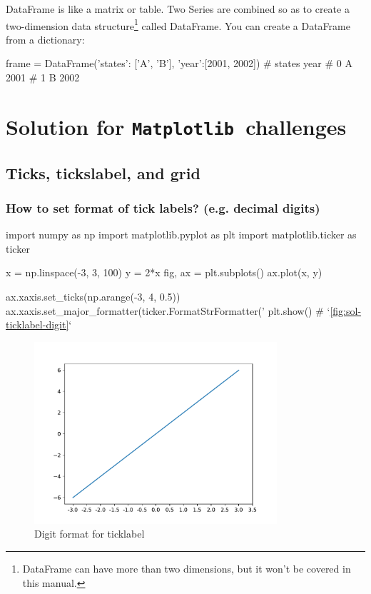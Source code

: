 \documentclass{report}
\newcommand{\mpl}{\texttt{Matplotlib}}
\begin{document}
DataFrame is like a matrix or table. Two Series are combined so as to create a two-dimension data structure\footnote{DataFrame can have more than two dimensions, but it won't be covered in this manual.} called DataFrame. You can create a DataFrame from a dictionary:
\begin{py}
frame = DataFrame({'states': ['A', 'B'], 'year':[2001, 2002]})
#   states  year
# 0      A  2001
# 1      B  2002
\end{py}

\chapter{Solution for \mpl\ challenges}
\section{Ticks, tickslabel, and grid}
\subsection{How to set format of tick labels? (e.g. decimal digits)}

\begin{py}
import numpy as np
import matplotlib.pyplot as plt
import matplotlib.ticker as ticker

x = np.linspace(-3, 3, 100)
y = 2*x
fig, ax = plt.subplots()
ax.plot(x, y)

ax.xaxis.set_ticks(np.arange(-3, 4, 0.5))
ax.xaxis.set_major_formatter(ticker.FormatStrFormatter('%
plt.show()  # `\autoref{fig:sol-ticklabel-digit}`
\end{py}

\begin{figure}[!htb]
  \centering
  \includegraphics[width=90mm]{sol-ticklabel-digit}
  \caption{Digit format for ticklabel}
  \label{fig:sol-ticklabel-digit}
\end{figure}
\end{document}
